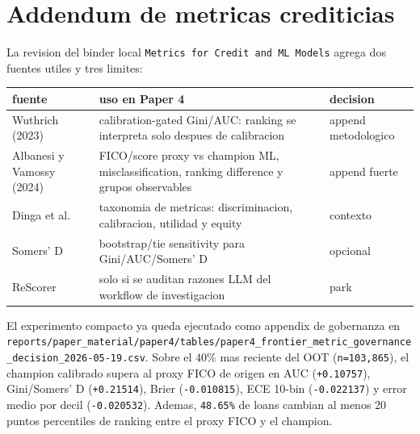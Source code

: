 \documentclass[
  spanish,
  11pt,
  letterpaper,
]{scrbook}
\newcounter{none} %
\theoremstyle{plain}
\theoremstyle{remark}
\begin{document}
\section{Addendum de metricas
crediticias}\label{addendum-de-metricas-crediticias}

La revision del binder local
\texttt{Metrics\ for\ Credit\ and\ ML\ Models} agrega dos fuentes utiles
y tres limites:

{\def\LTcaptype{none} %
\begin{longtable}[]{@{}
  >{\raggedright\arraybackslash}p{}
  >{\raggedright\arraybackslash}p{}
  >{\raggedright\arraybackslash}p{}@{}}
\toprule\noalign{}
\begin{minipage}[b]{\linewidth}\raggedright
fuente
\end{minipage} & \begin{minipage}[b]{\linewidth}\raggedright
uso en Paper 4
\end{minipage} & \begin{minipage}[b]{\linewidth}\raggedright
decision
\end{minipage} \\
\midrule\noalign{}
\endhead
\bottomrule\noalign{}
\endlastfoot
Wuthrich (2023) & calibration-gated Gini/AUC: ranking se interpreta solo
despues de calibracion & append metodologico \\
Albanesi y Vamossy (2024) & FICO/score proxy vs champion ML,
misclassification, ranking difference y grupos observables & append
fuerte \\
Dinga et al. & taxonomia de metricas: discriminacion, calibracion,
utilidad y equity & contexto \\
Somers' D & bootstrap/tie sensitivity para Gini/AUC/Somers' D &
opcional \\
ReScorer & solo si se auditan razones LLM del workflow de investigacion
& park \\
\end{longtable}
}

El experimento compacto ya queda ejecutado como appendix de gobernanza
en
\texttt{reports/paper\_material/paper4/tables/paper4\_frontier\_metric\_governance\_decision\_2026-05-19.csv}.
Sobre el 40\% mas reciente del OOT (\texttt{n=103,865}), el champion
calibrado supera al proxy FICO de origen en AUC (\texttt{+0.10757}),
Gini/Somers' D (\texttt{+0.21514}), Brier (\texttt{-0.010815}), ECE
10-bin (\texttt{-0.022137}) y error medio por decil
(\texttt{-0.020532}). Ademas, \texttt{48.65\%} de loans cambian al menos
20 puntos percentiles de ranking entre el proxy FICO y el champion.
\end{document}
